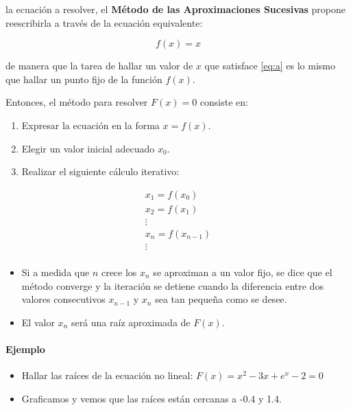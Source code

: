\documentclass[openany]{book}
\providecommand{\tightlist}{%
  \setlength{\itemsep}{0pt}\setlength{\parskip}{0pt}}
\let\oldparagraph\paragraph
\renewcommand{\paragraph}[1]{\oldparagraph{#1}\mbox{}}
\begin{document}
la ecuación a resolver, el \textbf{Método de las Aproximaciones Sucesivas} propone reescribirla a través de la ecuación equivalente:

\[
f(x) = x
\]

de manera que la tarea de hallar un valor de \(x\) que satisface \eqref{eq:a} es lo mismo que hallar un punto fijo de la función \(f(x)\).

Entonces, el método para resolver \(F(x) = 0\) consiste en:

\begin{enumerate}
\def\labelenumi{\arabic{enumi}.}
\tightlist
\item
  Expresar la ecuación en la forma \(x = f(x)\).
\item
  Elegir un valor inicial adecuado \(x_0\).
\item
  Realizar el siguiente cálculo iterativo:
\end{enumerate}

\begin{gather*}
x_1 = f(x_0) \\
x_2 = f(x_1) \\
\vdots \\
x_n = f(x_{n-1}) \\
\vdots \\
\end{gather*}

\begin{itemize}
\tightlist
\item
  Si a medida que \(n\) crece los \(x_n\) se aproximan a un valor fijo, se dice que el método converge y la iteración se detiene cuando la diferencia entre dos valores consecutivos \(x_{n-1}\) y \(x_n\) sea tan pequeña como se desee.
\item
  El valor \(x_n\) será una raíz aproximada de \(F(x)\).
\end{itemize}

\hypertarget{ejemplo}{%
\paragraph{Ejemplo}\label{ejemplo}}

\begin{itemize}
\tightlist
\item
  Hallar las raíces de la ecuación no lineal: \(F(x) = x^2-3x+e^x-2=0\)
\item
  Graficamos y vemos que las raíces están cercanas a -0.4 y 1.4.
\end{itemize}
\end{document}
